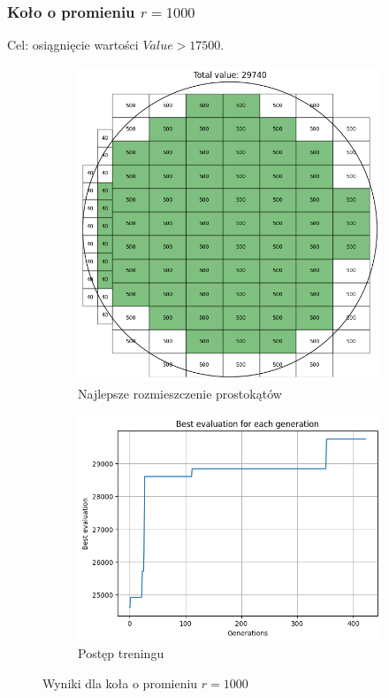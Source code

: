 \documentclass{article}
\begin{document}
\subsubsection*{Koło o promieniu $r=1000$}
Cel: osiągnięcie wartości $Value > 17500$.
\begin{figure}[H]
    \centering
    \begin{subfigure}{0.48\textwidth}
        \includegraphics[width=\linewidth]{img/ae2/r1000_fit.png}
        \caption{Najlepsze rozmieszczenie prostokątów}
    \end{subfigure}
    \hfill
    \begin{subfigure}{0.48\textwidth}
        \includegraphics[width=\linewidth]{img/ae2/r1000_history.png}
        \caption{Postęp treningu}
    \end{subfigure}
    \caption{Wyniki dla koła o promieniu $r=1000$}
\end{figure}
\newpage
\end{document}
